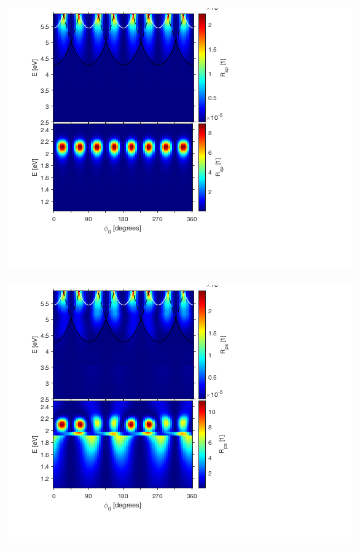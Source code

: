 \begin{figure}[h]  %
    \begin{subfigure}{0.5\textwidth}
        \centering
        \includegraphics[width=\linewidth, trim=1.1cm  1.8cm 6.7cm 0cm, clip]{figures/ch4/S6/contour/S6_Rsp.png}
    \end{subfigure}
    \begin{subfigure}{0.5\textwidth}
        \centering
        \includegraphics[width=\linewidth, trim=1.1cm  1.8cm 6.7cm 0cm, clip]{figures/ch4/S6/contour/S6_Rps.png}
    \end{subfigure}
    

\end{figure}
